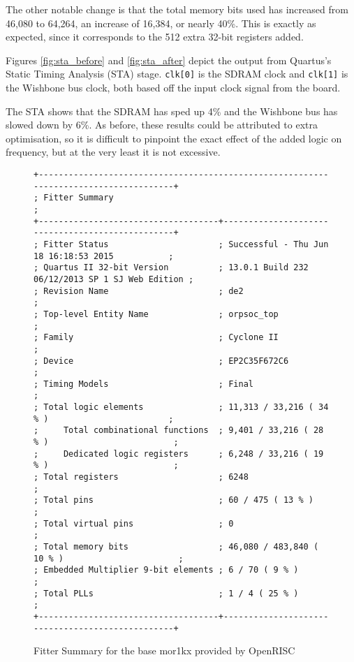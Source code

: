 The other notable change is that the total memory bits used has increased from 46,080 to 64,264, an increase of 16,384, or nearly 40\%. This is exactly as expected, since it corresponds to the 512 extra 32-bit registers added.

Figures \ref{fig:sta_before} and \ref{fig:sta_after} depict the output from Quartus's Static Timing Analysis (STA) stage. \verb|clk[0]| is the SDRAM clock and \verb|clk[1]| is the Wishbone bus clock, both based off the input clock signal from the board.

The STA shows that the SDRAM has sped up 4\% and the Wishbone bus has slowed down by 6\%. As before, these results could be attributed to extra optimisation, so it is difficult to pinpoint the exact effect of the added logic on frequency, but at the very least it is not excessive.

\begin{figure}[p]
  \centering
  \footnotesize
  \begin{verbatim}
+--------------------------------------------------------------------------------------+
; Fitter Summary                                                                       ;
+------------------------------------+-------------------------------------------------+
; Fitter Status                      ; Successful - Thu Jun 18 16:18:53 2015           ;
; Quartus II 32-bit Version          ; 13.0.1 Build 232 06/12/2013 SP 1 SJ Web Edition ;
; Revision Name                      ; de2                                             ;
; Top-level Entity Name              ; orpsoc_top                                      ;
; Family                             ; Cyclone II                                      ;
; Device                             ; EP2C35F672C6                                    ;
; Timing Models                      ; Final                                           ;
; Total logic elements               ; 11,313 / 33,216 ( 34 % )                        ;
;     Total combinational functions  ; 9,401 / 33,216 ( 28 % )                         ;
;     Dedicated logic registers      ; 6,248 / 33,216 ( 19 % )                         ;
; Total registers                    ; 6248                                            ;
; Total pins                         ; 60 / 475 ( 13 % )                               ;
; Total virtual pins                 ; 0                                               ;
; Total memory bits                  ; 46,080 / 483,840 ( 10 % )                       ;
; Embedded Multiplier 9-bit elements ; 6 / 70 ( 9 % )                                  ;
; Total PLLs                         ; 1 / 4 ( 25 % )                                  ;
+------------------------------------+-------------------------------------------------+
  \end{verbatim}
  \caption{Fitter Summary for the base mor1kx provided by OpenRISC}
  \label{fig:fit_before}
\end{figure}

